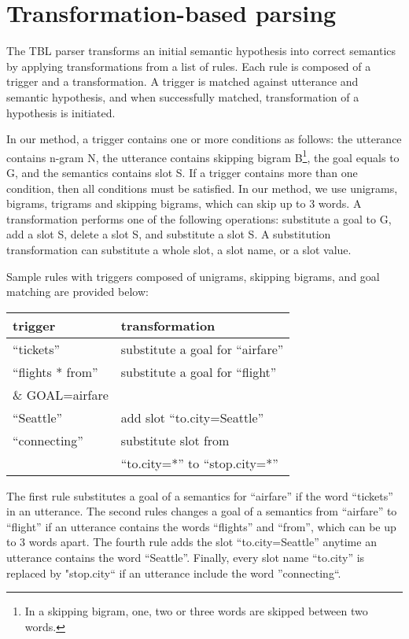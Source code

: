 \documentclass{article}
\begin{document}
\section{Transformation-based parsing} \label{sec:tbl}

The TBL parser transforms an initial semantic hypothesis into correct semantics by applying transformations from a list of rules. Each rule is composed of a trigger and a transformation. A trigger is matched against utterance and semantic hypothesis, and when successfully matched, transformation of a hypothesis is initiated. 

In our method, a trigger contains one or more conditions as follows: the utterance contains n-gram N, the utterance contains skipping bigram B\footnote{In a skipping bigram, one, two or three words are skipped between two words.}, the goal equals to G, and the semantics contains slot S. If a trigger contains more than one condition, then all conditions must be satisfied. In our method, we use unigrams, bigrams, trigrams and skipping bigrams, which can skip up to 3 words.
A transformation performs one of the following operations: substitute a goal to G, add a slot S, delete a slot S, and substitute a slot S. A substitution transformation can substitute a whole slot, a slot name, 
or a slot value. 

Sample rules with triggers composed of unigrams, skipping bigrams, and goal matching are provided below:

\vspace{.15cm}
\begin{tabular}{ll}
  trigger & transformation \\
  \hline 
  ``tickets''        & substitute a goal for ``airfare''\\
  ``flights * from'' & substitute a goal for ``flight'' \\
  \& GOAL=airfare     & \\
  ``Seattle''         & add slot ``to.city=Seattle'' \\
  ``connecting''     & substitute slot from\\
                     & ``to.city=*'' to ``stop.city=*'' \\
\end{tabular} 
\vspace{.15cm}

The first rule substitutes a goal of a semantics for ``airfare'' if the word ``tickets'' in an utterance. The second rules changes a goal of a semantics from ``airfare'' to ``flight'' if an utterance contains the words ``flights'' and ``from'', which can be up to 3 words apart. The fourth rule adds the slot ``to.city=Seattle'' anytime an utterance contains the word ``Seattle''. Finally, every slot name ``to.city'' is replaced by "stop.city`` if an utterance include the word ''connecting``.
\end{document}
